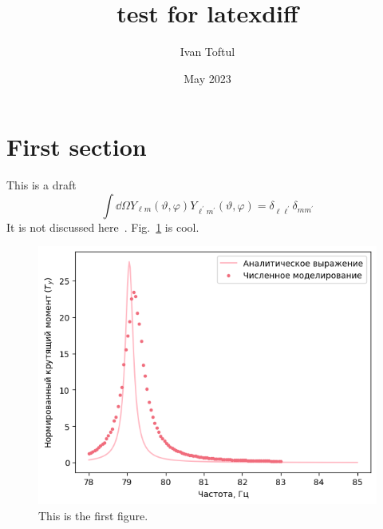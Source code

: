 \documentclass{revtex4-2}
\begin{document}
\title{test for latexdiff}
\author{Ivan Toftul}
\date{May 2023}

\maketitle

\section{First section}

This is a draft
\begin{equation}
    \int \dd \Omega Y_{\ell m} (\vartheta, \varphi) Y_{\ell^{\prime} m^{\prime}} (\vartheta, \varphi) = \delta_{\ell \ell^{\prime}} \delta_{m m^{\prime}}
\end{equation}
It is not discussed here~\cite{Toftul2019Oct}. Fig.~\ref{fig:figure1} is cool.

\begin{figure}
    \centering
    \includegraphics[width=0.7\linewidth]{fig/figure1.png}
    \caption{This is the first figure.}
    \label{fig:figure1}
\end{figure}


\end{document}
